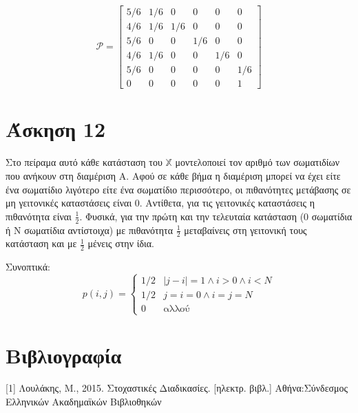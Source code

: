 \documentclass[a4paper,oneside, 11pt]{article}
\begin{document}
$$\mathcal{P} = \begin{bmatrix}
5/6 & 1/6 & 0 & 0 & 0 & 0\\
4/6 & 1/6 & 1/6 & 0 & 0 & 0 \\
5/6 & 0 & 0 & 1/6 & 0 & 0 \\
4/6 & 1/6 & 0 & 0 & 1/6 & 0 \\
5/6 & 0 & 0 & 0 & 0 & 1/6 \\
0 & 0 & 0 & 0 & 0 & 1
\end{bmatrix}
$$


\section*{Άσκηση 12}
Στο πείραμα αυτό κάθε κατάσταση του $\mathbb X$ μοντελοποιεί τον αριθμό των σωματιδίων που ανήκουν στη διαμέριση Α. Αφού σε κάθε βήμα η διαμέριση μπορεί να έχει είτε ένα σωματίδιο λιγότερο είτε ένα σωματίδιο περισσότερο, οι πιθανότητες μετάβασης σε μη γειτονικές καταστάσεις είναι 0. Αντίθετα, για τις γειτονικές καταστάσεις η πιθανότητα είναι $\frac{1}{2}$. Φυσικά, για την πρώτη και την τελευταία κατάσταση (0 σωματίδια ή N σωματίδια αντίστοιχα) με πιθανότητα $\frac{1}{2}$ μεταβαίνεις στη γειτονική τους κατάσταση και με $\frac{1}{2}$ μένεις στην ίδια. \bigbreak

Συνοπτικά:
$$
p(i,j) = \begin{cases}
1/2 & |j - i| = 1 \wedge i > 0 \wedge i < N \\
1/2 & j = i = 0 \wedge i = j = N \\
0 & \text{αλλού} 
\end{cases}
$$





\section*{Βιβλιογραφία}
[1] Λουλάκης, Μ., 2015. Στοχαστικές Διαδικασίες. [ηλεκτρ. βιβλ.] Αθήνα:Σύνδεσμος Ελληνικών Ακαδημαϊκών Βιβλιοθηκών
\end{document}
